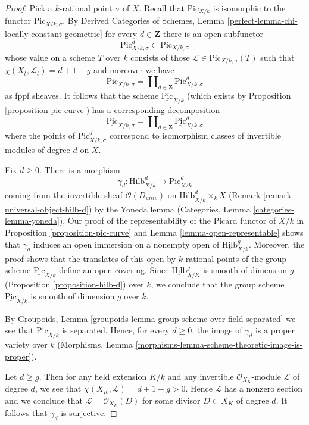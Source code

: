\documentclass{stacks-project}
\theoremstyle{plain}
\theoremstyle{definition}
\theoremstyle{remark}
\numberwithin{equation}{subsection}
\def\Hilbfunctor{\mathrm{Hilb}}
\def\Picardfunctor{\mathrm{Pic}}
\begin{document}
\begin{proof}
Pick a $k$-rational point $\sigma$ of $X$. Recall that $\Picardfunctor_{X/k}$
is isomorphic to the functor $\Picardfunctor_{X/k, \sigma}$. By
Derived Categories of Schemes, Lemma
\ref{perfect-lemma-chi-locally-constant-geometric}
for every $d \in \mathbf{Z}$ there is an open subfunctor
$$
\Picardfunctor^d_{X/k, \sigma} \subset \Picardfunctor_{X/k, \sigma}
$$
whose value on a scheme $T$ over $k$ consists of those
$\mathcal{L} \in \Picardfunctor_{X/k, \sigma}(T)$ such that
$\chi(X_t, \mathcal{L}_t) = d + 1 - g$ and moreover we have
$$
\Picardfunctor_{X/k, \sigma} =
\coprod\nolimits_{d \in \mathbf{Z}} \Picardfunctor^d_{X/k, \sigma}
$$
as fppf sheaves. It follows that the scheme $\underline{\Picardfunctor}_{X/k}$
(which exists by Proposition \ref{proposition-pic-curve})
has a corresponding decomposition
$$
\underline{\Picardfunctor}_{X/k, \sigma} =
\coprod\nolimits_{d \in \mathbf{Z}} \underline{\Picardfunctor}^d_{X/k, \sigma}
$$
where the points of $\underline{\Picardfunctor}^d_{X/k, \sigma}$ correspond
to isomorphism classes of invertible modules of degree $d$ on $X$.

\medskip\noindent
Fix $d \geq 0$. There is a morphism
$$
\gamma_d :
\underline{\Hilbfunctor}^d_{X/k}
\longrightarrow
\underline{\Picardfunctor}^d_{X/k}
$$
coming from the invertible sheaf $\mathcal{O}(D_{univ})$ on
$\underline{\Hilbfunctor}^d_{X/k} \times_k X$
(Remark \ref{remark-universal-object-hilb-d}) by the Yoneda lemma
(Categories, Lemma \ref{categories-lemma-yoneda}).
Our proof of the representability of the Picard functor of $X/k$
in Proposition \ref{proposition-pic-curve} and
Lemma \ref{lemma-open-representable} shows that $\gamma_g$
induces an open immersion on a nonempty open of
$\underline{\Hilbfunctor}^g_{X/k}$. Moreover, the proof shows
that the translates of this open by $k$-rational points of
the group scheme $\underline{\Picardfunctor}_{X/k}$ define
an open covering. Since
$\underline{\Hilbfunctor}^g_{X/K}$ is smooth of dimension $g$
(Proposition \ref{proposition-hilb-d})
over $k$, we conclude that the
group scheme $\underline{\Picardfunctor}_{X/k}$ is smooth of dimension $g$
over $k$.

\medskip\noindent
By Groupoids, Lemma \ref{groupoids-lemma-group-scheme-over-field-separated}
we see that $\underline{\Picardfunctor}_{X/k}$ is separated.
Hence, for every $d \geq 0$, the image of $\gamma_d$
is a proper variety over $k$
(Morphisms, Lemma \ref{morphisms-lemma-scheme-theoretic-image-is-proper}).

\medskip\noindent
Let $d \geq g$. Then for any field extension $K/k$ and any invertible
$\mathcal{O}_{X_K}$-module $\mathcal{L}$ of degree $d$, we see that
$\chi(X_K, \mathcal{L}) = d + 1 - g > 0$. Hence $\mathcal{L}$ has a
nonzero section and we conclude that $\mathcal{L} = \mathcal{O}_{X_K}(D)$
for some divisor $D \subset X_K$ of degree $d$. It follows that
$\gamma_d$ is surjective.


\end{proof}
\end{document}
